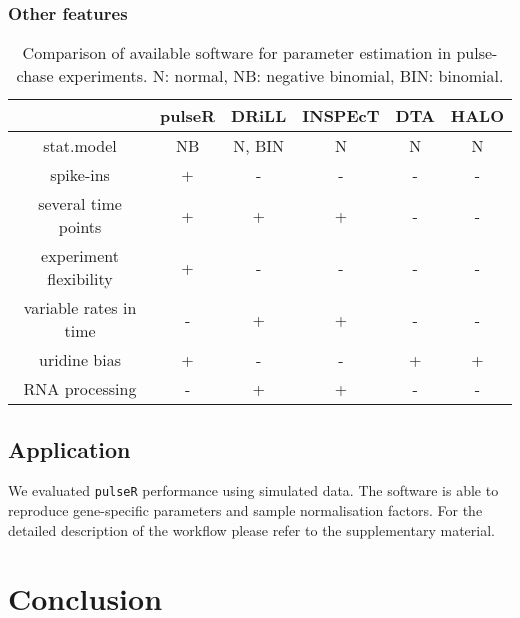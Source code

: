 \subsubsection*{Other features}
\begin{table}
 \begin{tabular}{|c|c|c|c|c|c|}\hline
                        &pulseR &DRiLL          &INSPEcT&DTA    &HALO       \\\hline
 stat.model             & NB    &N, BIN         &N       & N     &N      \\\hline                         
 spike-ins              & +     &   -           &  -     &  -    & -         \\\hline               
 several time points    & +     &    +          &  +     &  -    & -         \\\hline                    
 experiment flexibility & +     &   -           &  -     &  -    & -         \\\hline 
 variable rates in time &  -    &    +          &  +     &  -    & -         \\\hline 
            uridine bias& +     &   -           &  -     &  +    & +         \\\hline 
       RNA processing   & -     &    +          &  +     &  -    & -         \\\hline 
 \end{tabular}
\caption{Comparison of available software for parameter estimation in 
pulse-chase experiments. N: normal, NB: negative binomial, BIN: binomial.}
\end{table}

\subsection{Application}
We evaluated \verb|pulseR| performance using simulated data. 
The software is able to reproduce gene-specific parameters and 
sample normalisation factors.
For the detailed
description of the workflow please refer to the supplementary material.

\section{Conclusion}
